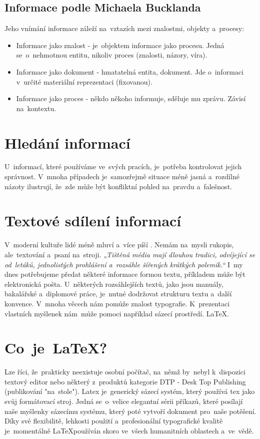 \documentclass[11pt,a4paper,titlepage]{article}
\begin{document}
\subsection{Informace podle Michaela Bucklanda}
Jeho vnímání informace záleží na~vztazích mezi znalostmi, objekty a~procesy:
\begin{itemize}
  \item Informace jako znalost - je~objektem informace jako procesu. Jedná se~o~nehmotnou entitu, nikoliv proces (znalosti, názory, víra).
  \item Informace jako dokument - hmatatelná entita, dokument. Jde o~informaci v~určité materiální reprezentaci (fixovanou).
  \item Informace jako proces - někdo někoho informuje, sděluje mu zprávu. Závisí na~kontextu. \cite{online_buckland}
\end{itemize}
\section{Hledání informací}
U~informací, které používáme ve~svých pracích, je~potřeba kontrolovat jejich správnost. V~mnoha případech je~samozřejmě situace méně jasná a~rozdílné názoty ilustrují, že~zde může být konfliktní pohled na~pravdu a~falešnost.\cite{Ar_Information}
\section{Textové sdílení informací}
V~moderní kultuře lidé méně mluví a~více píší . Nemám na~mysli rukopis, ale~textování a~psaní na~stroji.
\cite{Ar_Luv2TxT}
\textit{„Tištěná média mají dlouhou tradici, odvíjející se od~letáků, jednolistých prohlášení a~rozsáhle šířených krátkých polemik.“}\cite{Douda_informace} I~my dnes potřebujeme předat některé informace formou textu, příkladem může být elektronická pošta. U~některých rozsáhlejších textů, jako jsou manuály, bakalářské a~diplomové práce, je~nutné dodržovat strukturu textu a~další konvence. V~mnoha věcech nám pomůže znalost typografie. K~prezentaci vlastních myšlenek nám~může pomoci například sázecí prostředí. \LaTeX .
\section{Co~je~\LaTeX?}
Lze říci, že~prakticky neexistuje osobní počítač, na~němž by~nebyl k~dispozici textový editor nebo některý z~produktů kategorie DTP - Desk Top Publishing (publikování "na~stole"). \cite{RybickaLatex}
Latex je~generický sázecí systém, který používá tex jako svůj formátovací stroj.\cite{Latex_companion} Jedná se~o~velice elegantní sérii příkazů, které posílají naše myšlenky sázecímu systému, který poté vytvoří dokument pro~naše potěšení.\cite{programujte}
Díky své flexibilitě, lehkosti použití a~profesionální typografické kvalitě je~momentálně \LaTeX používán skoro ve~všech humanitních oblastech a~ve~vědě.\cite{Latex_companion}
\newpage

\end{document}
